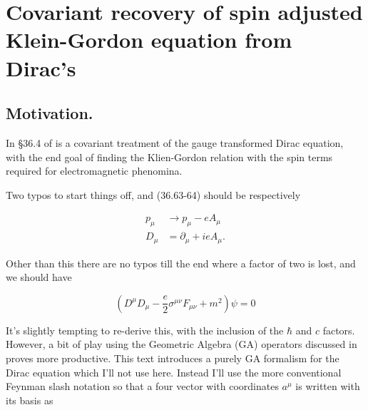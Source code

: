 
%

\chapter{Covariant recovery of spin adjusted Klein-Gordon equation from Dirac's}
\label{chap:diracCovariant}
{}
\date{Sept 1, 2011}

\newcommand{\pslash}[0]{\cancel{p}}
\newcommand{\aslash}[0]{\cancel{a}}
\newcommand{\bslash}[0]{\cancel{b}}
\newcommand{\Dslash}[0]{\cancel{D}}
\newcommand{\Aslash}[0]{\cancel{A}}
\newcommand{\partialslash}[0]{\cancel{\partial}}

\beginArtWithToc

\section{Motivation.}

In \S 36.4 of \cite{desai2009quantum} is a covariant treatment of the gauge transformed Dirac equation, with the end goal of finding the Klien-Gordon relation with the spin terms required for electromagnetic phenomina.

Two typos to start things off, and (36.63-64) should be respectively

\begin{align}\label{eqn:diracCovariant:10}
p_\mu &\rightarrow p_\mu - e A_\mu \\
D_\mu &= \partial_\mu + i e A_\mu.
\end{align}

Other than this there are no typos till the end where a factor of two is lost, and we should have

\begin{equation}\label{eqn:diracCovariant:30}
\left( D^\mu D_\mu - \frac{e}{2} \sigma^{\mu \nu} F_{\mu \nu} + m^2 \right) \psi = 0
\end{equation}

It's slightly tempting to re-derive this, with the inclusion of the $\hbar$ and $c$ factors.  However, a bit of play using the Geometric Algebra (GA) operators discussed in \cite{doran2003gap} proves more productive.  This text introduces a purely GA formalism for the Dirac equation which I'll not use here.  Instead I'll use the more conventional Feynman slash notation so that a four vector with coordinates $a^\mu$ is written with its basis as

